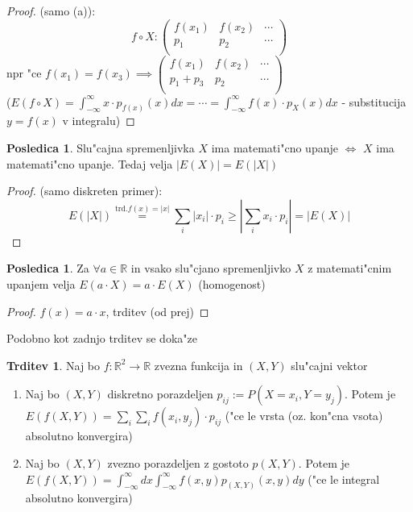 \documentclass[a4paper,12pt]{article}
\theoremstyle{definition}
\newtheorem{conseq}[counter]{Posledica}
\newtheorem{claim}[counter]{Trditev}
\theoremstyle{remark}
\newcommand{\R}{\mathbb{R}}
\begin{document}
\begin{proof}
    (samo (a)): \\
    \begin{equation*}
        f \circ X: \begin{pmatrix}
            f(x_1) & f(x_2) & \cdots \\
            p_1 & p_2 & \cdots \\
        \end{pmatrix}
    \end{equation*}
    npr "ce $f(x_1) = f(x_3) \implies \begin{pmatrix}
        f(x_1) & f(x_2) & \cdots \\
        p_1 + p_3 & p_2 & \cdots \\
    \end{pmatrix}$ \\
    ($E(f \circ X) = \int_{-\infty}^{\infty} x \cdot p_{f(x)}(x) dx = \cdots =
    \int_{-\infty}^{\infty} f(x) \cdot p_X(x) dx$ - substitucija $y=f(x)$ v integralu)
\end{proof}




\begin{conseq}
    Slu"cajna spremenljivka $X$ ima matemati"cno upanje $\iff$ $X$ ima matemati"cno upanje. Tedaj velja
    $|E(X)| = E(|X|)$
\end{conseq}

\begin{proof}
    (samo diskreten primer): \\
    \begin{equation*}
        E(|X|) \stackrel{\text{trd.} f(x)=|x|}{=} \sum_i |x_i| \cdot p_i \geq |\sum_i x_i \cdot p_i| = |E(X)|
    \end{equation*}
\end{proof}

\begin{conseq}
    Za $\forall a \in \R$ in vsako slu"cjano spremenljivko $X$ z matemati"cnim upanjem velja $E(a \cdot X) = a \cdot E(X)$
    (homogenost)
\end{conseq}

\begin{proof}
    $f(x) = a \cdot x$, trditev (od prej)
\end{proof}

Podobno kot zadnjo trditev se doka"ze

\begin{claim}
    Naj bo $f: \R^2 \to \R$ zvezna funkcija in $(X,Y)$ slu"cajni vektor
    \begin{enumerate}[label=(\alph*)]
        \item Naj bo $(X,Y)$ diskretno porazdeljen $p_{ij} := P(X=x_i, Y=y_j)$. Potem je $E(f(X,Y)) = \sum_i \sum_i
            f(x_i,y_j) \cdot p_{ij}$ ("ce le vrsta (oz. kon"cna vsota) absolutno konvergira)
        \item Naj bo $(X,Y)$ zvezno porazdeljen z gostoto $p(X,Y)$. Potem je $E(f(X,Y)) = \int_{-\infty}^{\infty} dx
            \int_{-\infty}^{\infty} f(x,y) p_{(X,Y)}(x,y) dy$ ("ce le integral absolutno konvergira)
    \end{enumerate}
\end{claim}
\end{document}
